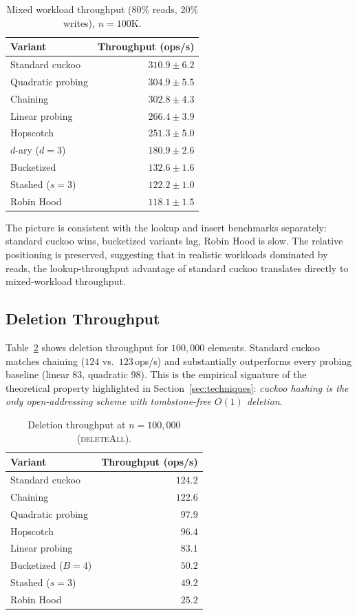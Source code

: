 \documentclass[10pt,journal,compsoc]{IEEEtran}
\begin{document}
\begin{table}[h]
\centering
\caption{Mixed workload throughput (80\% reads, 20\% writes), $n=100\mathrm{K}$.}
\label{tab:mixed}
\begin{tabular}{@{}lr@{}}
\toprule
Variant           & Throughput (ops/s) \\
\midrule
Standard cuckoo   & $310.9 \pm 6.2$ \\
Quadratic probing & $304.9 \pm 5.5$ \\
Chaining          & $302.8 \pm 4.3$ \\
Linear probing    & $266.4 \pm 3.9$ \\
Hopscotch         & $251.3 \pm 5.0$ \\
$d$-ary ($d=3$)   & $180.9 \pm 2.6$ \\
Bucketized        & $132.6 \pm 1.6$ \\
Stashed ($s=3$)   & $122.2 \pm 1.0$ \\
Robin Hood        & $118.1 \pm 1.5$ \\
\bottomrule
\end{tabular}
\end{table}

The picture is consistent with the lookup and insert benchmarks separately: standard cuckoo wins, bucketized variants lag, Robin Hood is slow. The relative positioning is preserved, suggesting that in realistic workloads dominated by reads, the lookup-throughput advantage of standard cuckoo translates directly to mixed-workload throughput.

\subsection{Deletion Throughput}

Table~\ref{tab:delete} shows deletion throughput for $100{,}000$ elements. Standard cuckoo matches chaining ($124$ vs.\ $123$\,ops/s) and substantially outperforms every probing baseline (linear $83$, quadratic $98$). This is the empirical signature of the theoretical property highlighted in Section~\ref{sec:techniques}: \emph{cuckoo hashing is the only open-addressing scheme with tombstone-free $O(1)$ deletion}.

\begin{table}[h]
\centering
\caption{Deletion throughput at $n=100{,}000$ (\textsc{deleteAll}).}
\label{tab:delete}
\begin{tabular}{@{}lr@{}}
\toprule
Variant            & Throughput (ops/s) \\
\midrule
Standard cuckoo    & $124.2$ \\
Chaining           & $122.6$ \\
Quadratic probing  & $97.9$  \\
Hopscotch          & $96.4$  \\
Linear probing     & $83.1$  \\
Bucketized ($B=4$) & $50.2$  \\
Stashed ($s=3$)    & $49.2$  \\
Robin Hood         & $25.2$  \\
\bottomrule
\end{tabular}
\end{table}
\end{document}
